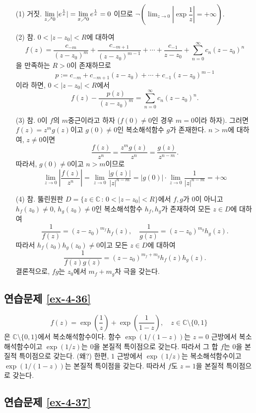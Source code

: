 \begin{itemize}
\item[(1)] 거짓.
$\lim\limits_{z\nearrow 0} |e^{\frac1x}| = \lim\limits_{x\nearrow 0} e^{\frac1x} = 0$
이므로 $\neg \left( \lim_{z\to 0} \left| \exp\dfrac1z\right| = + \infty \right)$.
\item[(2)] 참.
$0<|z-z_0|<R$에 대하여
\[
f(z) = \dfrac{c_{-m}}{(z-z_0)^m} + \dfrac{c_{-m+1}}{(z-z_0)^{m-1}} + \cdots 
+ \dfrac{c_{-1}}{z-z_0} + \sum_{n=0}^\infty c_n(z-z_0)^n
\]
을 만족하는 $R>0$이 존재하므로
\[
p:= c_{-m} + c_{-m+1}(z-z_0) + \cdots  + c_{-1}(z-z_0)^{m-1}
\]
이라 하면, $0<|z-z_0|<R$에서
\[
f(z) - \dfrac{p(z)}{(z-z_0)^m} = \sum_{n=0}^\infty c_n(z-z_0)^n.
\]
\item[(3)] 참.
$0$이 $f$의 $m$중근이라고 하자 ($f(0)\ne0$인 경우 $m=0$이라 하자).
그러면 $f(z)=z^mg(z)$이고 $g(0)\ne0$인 복소해석함수 $g$가 존재한다.
$n>m$에 대하여, $z\ne0$이면
\[
\dfrac{f(z)}{z^n} = \dfrac{z^mg(z)}{z^n} = \dfrac{g(z)}{z^{n-m}}.
\]
따라서, $g(0)\ne0$이고 $n>m$이므로
\[
\lim_{z\to0} \left| \dfrac{f(z)}{z^n}\right| 
=\lim_{z\to0} \dfrac{|g(z)|}{|z|^{n-m}} = |g(0)|\cdot \lim_{z\to0}\dfrac1{|z|^{n-m}} = +\infty
\]
\item[(4)] 참.
뚫린원판 $D=\{ z\in \mathbb C\,:\, 0<|z-z_0| <R\}$에서
$f,g$가 $0$이 아니고 $h_f(z_0)\ne0$, $h_g(z_0)\ne0$인 복소해석함수 $h_f, h_g$가 존재하여
모든 $z\in D$에 대하여
\[
\dfrac1{f(z)} = (z-z_0)^{m_f} h_f(z),\quad
\dfrac1{g(z)} = (z-z_0)^{m_g} h_g(z).
\]
따라서 $h_f(z_0)h_g(z_0)\ne0$이고 모든 $z\in D$에 대하여
\[
\dfrac1{f(z)g(z)} = (z-z_0)^{m_f+m_g} h_f(z)h_g(z).
\]
결론적으로, $fg$는 $z_0$에서 $m_f+m_g$차 극을 갖는다.
\end{itemize}

\subsection*{연습문제 \ref{ex-4-36}}

\[
f(z) = \exp \left(\dfrac 1z \right) + \exp \left(\dfrac1{1-z}\right),
\quad z\in \mathbb C\setminus\{0,1\}
\]
은 $\mathbb C\setminus\{0,1\}$에서 복소해석함수이다.
함수 $\exp(1/(1-z))$는 $z=0$ 근방에서 복소해석함수이고
$\exp(1/z)$는 $0$을 본질적 특이점으로 갖는다. 따라서 그 합 $f$는 $0$을
본질적 특이점으로 갖는다. (왜?) 한편, $1$ 근방에서 $\exp(1/z)$는 복소해석함수이고
$\exp(1/(1-z))$는 본질적 특이점을 갖는다. 따라서 $f$도 $z=1$을 본질적 특이점으로 갖는다.

\subsection*{연습문제 \ref{ex-4-37}}

